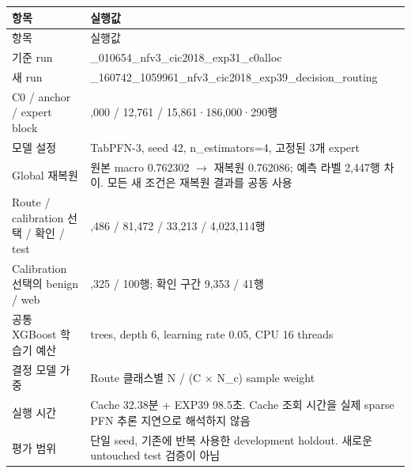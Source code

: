 \begingroup
\footnotesize
\begin{longtable}{>{\raggedright\arraybackslash}p{}>{\raggedright\arraybackslash}p{}}
\toprule
항목 & 실행값 \\ \midrule
\endfirsthead
항목 & 실행값 \\ \midrule
\endhead
{}기준 run & 20260904\_\allowbreak{}010654\_\allowbreak{}nfv3\_\allowbreak{}cic2018\_\allowbreak{}exp31\_\allowbreak{}c0alloc \\
{}새 run & 20260909\_\allowbreak{}160742\_\allowbreak{}1059961\_\allowbreak{}nfv3\_\allowbreak{}cic2018\_\allowbreak{}exp39\_\allowbreak{}decision\_\allowbreak{}routing \\
{}C0 /\allowbreak{} anchor /\allowbreak{} expert block & 100,000 /\allowbreak{} 12,761 /\allowbreak{} 15,861·186,000·290행 \\
{}모델 설정 & TabPFN-3, seed 42, n\_\allowbreak{}estimators=\allowbreak{}4, 고정된 3개 expert \\
{}Global 재복원 & 원본 macro 0.762302  \ensuremath{\rightarrow}  재복원 0.762086; 예측 라벨 2,447행 차이. 모든 새 조건은 재복원 결과를 공동 사용 \\
{}Route /\allowbreak{} calibration 선택 /\allowbreak{} 확인 /\allowbreak{} test & 391,486 /\allowbreak{} 81,472 /\allowbreak{} 33,213 /\allowbreak{} 4,023,114행 \\
{}Calibration 선택의 benign /\allowbreak{} web & 22,325 /\allowbreak{} 100행; 확인 구간 9,353 /\allowbreak{} 41행 \\
{}공통 XGBoost 학습기 예산 & 300 trees, depth 6, learning rate 0.05, CPU 16 threads \\
{}결정 모델 가중 & Route 클래스별 N /\allowbreak{} (C × N\_\allowbreak{}c) sample weight \\
{}실행 시간 & Cache 32.38분 +\allowbreak{} EXP39 98.5초. Cache 조회 시간을 실제 sparse PFN 추론 지연으로 해석하지 않음 \\
{}평가 범위 & 단일 seed, 기존에 반복 사용한 development holdout. 새로운 untouched test 검증이 아님 \\
\bottomrule
\end{longtable}
\endgroup
\begingroup
\footnotesize
